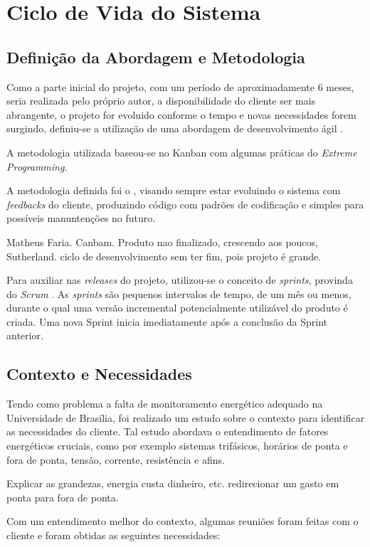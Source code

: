 \chapter{Ciclo de Vida do Sistema}
\section{Definição da Abordagem e Metodologia}
Como a parte inicial do projeto, com um período de aproximadamente 6 meses, seria realizada pelo próprio autor, a disponibilidade do cliente ser mais abrangente, o projeto for evoluido conforme o tempo e novas necessidades forem surgindo, definiu-se a utilização de uma abordagem de desenvolvimento ágil \cite{beck2001agile}.


A metodologia utilizada baseou-se no Kanban \cite{radigan_2015} com algumas práticas do \textit{Extreme Programming}.

A metodologia definida foi o  \cite{beck_2004}, visando sempre estar evoluindo o sistema com \textit{feedbacks} do cliente, produzindo código com padrões de codificação e simples para possíveis manuntenções no futuro.



Matheus Faria. Canbam. Produto nao finalizado, crescendo aos poucos, Sutherland. ciclo de desenvolvimento sem ter fim, pois projeto é grande.

Para auxiliar nas \textit{releases} do projeto, utilizou-se o conceito de \textit{sprints}, provinda do \textit{Scrum} \cite{scrum_guide}. As \textit{sprints} são pequenos intervalos de tempo, de um mês ou menos, durante o qual uma versão incremental potencialmente utilizável do produto é criada. Uma nova Sprint inicia imediatamente após a conclusão da Sprint anterior.

\section{Contexto e Necessidades}
Tendo como problema a falta de monitoramento energético adequado na Universidade de Brasília, foi realizado um estudo sobre o contexto para identificar as necessidades do cliente. Tal estudo abordava o entendimento de fatores energéticos cruciais, como por exemplo sistemas trifásicos, horários de ponta e fora de ponta, tensão, corrente, resistência e afins.

Explicar as grandezas, energia custa dinheiro, etc. redirecionar um gasto em ponta para fora de ponta.

Com um entendimento melhor do contexto, algumas reuniões foram feitas com o cliente e foram obtidas as seguintes necessidades:

